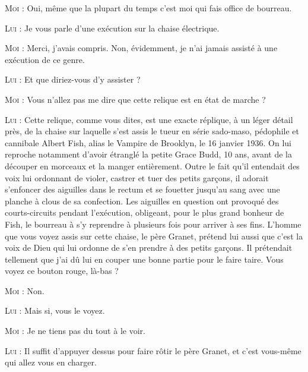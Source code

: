 \begin{dialogue}
\textsc{Moi} : Oui, même que la plupart du temps c’est moi qui fais office de bourreau.

\textsc{Lui} : Je vous parle d’une exécution sur la chaise électrique.

%
%
%
\textsc{Moi} : Merci, j’avais compris. Non, évidemment, je n’ai jamais assisté à une exécution de ce genre.

\textsc{Lui} : Et que diriez-vous d’y assister ? 

\textsc{Moi} : Vous n’allez pas me dire que cette relique est en état de marche ?

\textsc{Lui} : Cette relique, comme vous dites, est une exacte réplique, à un léger détail près, de la chaise sur laquelle s’est assis le tueur en série sado-maso, pédophile et cannibale Albert Fish, alias le Vampire de Brooklyn, le 16 janvier 1936. On lui reproche notamment d’avoir étranglé la petite Grace Budd, 10 ans, avant de la découper en morceaux et la manger entièrement. Outre le fait qu’il entendait des voix lui ordonnant de violer, castrer et tuer des petits garçons, il adorait s’enfoncer des aiguilles dans le rectum et se fouetter jusqu’au sang avec une planche à clous de sa confection. Les aiguilles en question ont provoqué des courts-circuits pendant l’exécution, obligeant, pour le plus grand bonheur de Fish, le bourreau à s’y reprendre à plusieurs fois pour arriver à ses fins. L’homme que vous voyez assis sur cette chaise, le père Granet, prétend lui aussi que c’est la voix de Dieu qui lui ordonne de s’en prendre à des petits garçons. Il prétendait tellement que j’ai dû lui en couper une bonne partie pour le faire taire. Vous voyez ce bouton rouge, là-bas ?

\textsc{Moi} : Non.

\textsc{Lui} : Mais si, vous le voyez.

\textsc{Moi} : Je ne tiens pas du tout à le voir.

\textsc{Lui} : Il suffit d’appuyer dessus pour faire rôtir le père Granet, et c’est vous-même qui allez vous en charger.

\end{dialogue}

